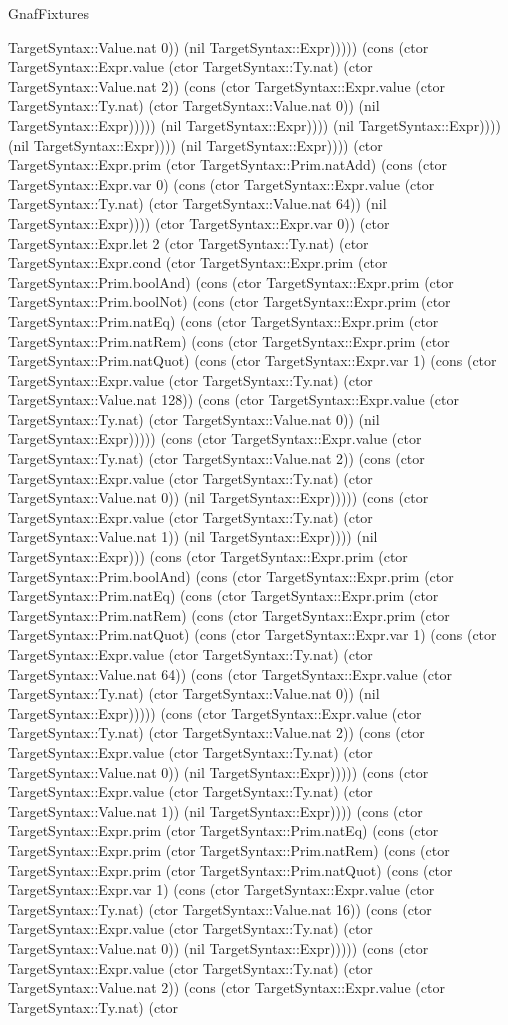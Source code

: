 \begin{lexlean}{GnafFixtures}
\begin{semanticmodule}
{TargetSyntax::Value.nat 0)) (nil TargetSyntax::Expr))))) (cons (ctor TargetSyntax::Expr.value (ctor TargetSyntax::Ty.nat) (ctor TargetSyntax::Value.nat 2)) (cons (ctor TargetSyntax::Expr.value (ctor TargetSyntax::Ty.nat) (ctor TargetSyntax::Value.nat 0)) (nil TargetSyntax::Expr))))) (nil TargetSyntax::Expr)))) (nil TargetSyntax::Expr)))) (nil TargetSyntax::Expr)))) (nil TargetSyntax::Expr)))) (ctor TargetSyntax::Expr.prim (ctor TargetSyntax::Prim.natAdd) (cons (ctor TargetSyntax::Expr.var 0) (cons (ctor TargetSyntax::Expr.value (ctor TargetSyntax::Ty.nat) (ctor TargetSyntax::Value.nat 64)) (nil TargetSyntax::Expr)))) (ctor TargetSyntax::Expr.var 0)) (ctor TargetSyntax::Expr.let 2 (ctor TargetSyntax::Ty.nat) (ctor TargetSyntax::Expr.cond (ctor TargetSyntax::Expr.prim (ctor TargetSyntax::Prim.boolAnd) (cons (ctor TargetSyntax::Expr.prim (ctor TargetSyntax::Prim.boolNot) (cons (ctor TargetSyntax::Expr.prim (ctor TargetSyntax::Prim.natEq) (cons (ctor TargetSyntax::Expr.prim (ctor TargetSyntax::Prim.natRem) (cons (ctor TargetSyntax::Expr.prim (ctor TargetSyntax::Prim.natQuot) (cons (ctor TargetSyntax::Expr.var 1) (cons (ctor TargetSyntax::Expr.value (ctor TargetSyntax::Ty.nat) (ctor TargetSyntax::Value.nat 128)) (cons (ctor TargetSyntax::Expr.value (ctor TargetSyntax::Ty.nat) (ctor TargetSyntax::Value.nat 0)) (nil TargetSyntax::Expr))))) (cons (ctor TargetSyntax::Expr.value (ctor TargetSyntax::Ty.nat) (ctor TargetSyntax::Value.nat 2)) (cons (ctor TargetSyntax::Expr.value (ctor TargetSyntax::Ty.nat) (ctor TargetSyntax::Value.nat 0)) (nil TargetSyntax::Expr))))) (cons (ctor TargetSyntax::Expr.value (ctor TargetSyntax::Ty.nat) (ctor TargetSyntax::Value.nat 1)) (nil TargetSyntax::Expr)))) (nil TargetSyntax::Expr))) (cons (ctor TargetSyntax::Expr.prim (ctor TargetSyntax::Prim.boolAnd) (cons (ctor TargetSyntax::Expr.prim (ctor TargetSyntax::Prim.natEq) (cons (ctor TargetSyntax::Expr.prim (ctor TargetSyntax::Prim.natRem) (cons (ctor TargetSyntax::Expr.prim (ctor TargetSyntax::Prim.natQuot) (cons (ctor TargetSyntax::Expr.var 1) (cons (ctor TargetSyntax::Expr.value (ctor TargetSyntax::Ty.nat) (ctor TargetSyntax::Value.nat 64)) (cons (ctor TargetSyntax::Expr.value (ctor TargetSyntax::Ty.nat) (ctor TargetSyntax::Value.nat 0)) (nil TargetSyntax::Expr))))) (cons (ctor TargetSyntax::Expr.value (ctor TargetSyntax::Ty.nat) (ctor TargetSyntax::Value.nat 2)) (cons (ctor TargetSyntax::Expr.value (ctor TargetSyntax::Ty.nat) (ctor TargetSyntax::Value.nat 0)) (nil TargetSyntax::Expr))))) (cons (ctor TargetSyntax::Expr.value (ctor TargetSyntax::Ty.nat) (ctor TargetSyntax::Value.nat 1)) (nil TargetSyntax::Expr)))) (cons (ctor TargetSyntax::Expr.prim (ctor TargetSyntax::Prim.natEq) (cons (ctor TargetSyntax::Expr.prim (ctor TargetSyntax::Prim.natRem) (cons (ctor TargetSyntax::Expr.prim (ctor TargetSyntax::Prim.natQuot) (cons (ctor TargetSyntax::Expr.var 1) (cons (ctor TargetSyntax::Expr.value (ctor TargetSyntax::Ty.nat) (ctor TargetSyntax::Value.nat 16)) (cons (ctor TargetSyntax::Expr.value (ctor TargetSyntax::Ty.nat) (ctor TargetSyntax::Value.nat 0)) (nil TargetSyntax::Expr))))) (cons (ctor TargetSyntax::Expr.value (ctor TargetSyntax::Ty.nat) (ctor TargetSyntax::Value.nat 2)) (cons (ctor TargetSyntax::Expr.value (ctor TargetSyntax::Ty.nat) (ctor }
\end{semanticmodule}
\end{lexlean}
